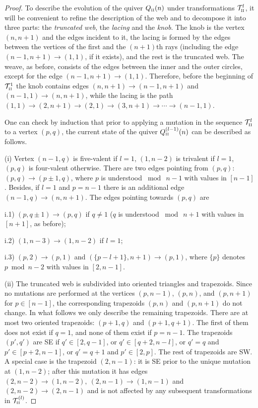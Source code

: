\documentclass{amsart}
\theoremstyle{definition}
\theoremstyle{remark}
\numberwithin{equation}{section}
\numberwithin{theorem}{section}
\begin{document}
\begin{proof}
To describe the evolution of the quiver $Q_{\mbox{\tiny\rm II}}(n)$ under transformations ${{\mathcal T}}^l_{\mbox{\tiny\rm II}}$, 
it will be convenient to refine the description
of the web and to decompose it into three parts: 
the {\it truncated web\/}, the {\it lacing\/} and the {\it knob\/}.
The knob is the vertex $(n,n+1)$ and the edges incident to it, the lacing is formed by the edges between the vertices of the first and the $(n+1)$th rays (including the edge $(n-1,n+1)\to (1,1)$, if it exists), 
and the rest is the truncated web. The weave, as before, consists of the edges
 between the inner and the outer circles, except for the edge $(n-1,n+1)\to (1,1)$. 
Therefore, before the beginning of ${{\mathcal T}}^1_{\mbox{\tiny\rm II}}$ the knob
contains edges $(n,n+1)\to (n-1,n+1)$ and $(n-1,1)\to (n,n+1)$, while the lacing is the path
$(1,1)\to (2,n+1)\to (2,1)\to (3,n+1)\to\cdots\to (n-1,1)$.
 
One can check by induction that prior to applying a mutation in the sequence ${{\mathcal T}}^l_{\mbox{\tiny\rm II}}$ to a vertex $(p,q)$, the current state of the quiver $Q^{(l-1)}_{\mbox{\tiny\rm II}}(n)$ can be described as follows. 

(i) Vertex $(n-1,q)$ is five-valent if $l=1$, $(1,n-2)$ is trivalent if $l=1$, $(p,q)$ is four-valent otherwise.
There are two edges pointing from $(p,q)$: $(p,q) \to (p\pm 1,q)$, where $p$ is understood $\bmod\ 
n-1$ with values in $[n-1]$. Besides, if $l=1$ and $p=n-1$ there is an additional edge $(n-1,q) \to (n,n+1)$.
The edges pointing towards $(p,q)$ are

i.1) $(p, q\pm 1) \to (p,q)$ if $ q\ne1$  
($q$ is understood $\bmod\ n+1$ with values in $[n+1]$, as before);

i.2) $(1, n- 3) \to (1,n-2)$  if $l=1$;

i.3) $(p, 2) \to (p,1)$ and $(\{p-l+1\}, n+1) \to (p,1)$, where $\{p\}$ denotes $p\bmod n-2$ with values in $[2,n-1]$.

(ii) The truncated web is subdivided into  oriented triangles and trapezoids. 
Since no mutations are performed at the vertices $(p,n-1)$, $(p,n)$, and $(p,n+1)$ for $p\in [n-1]$,
the corresponding trapezoids $(p,n)$ and $(p,n+1)$ do not change. In what follows we only
describe the remaining trapezoids.
There are at most two oriented trapezoids: $(p+1,q)$ and $(p+1,q+1)$. The first of them does not exist
if $q=1$, and none of them exist if $p=n-1$. 
The trapezoids $(p',q')$ are SE if $q'\in [2,q-1]$, or $q'\in [q+2,n-l]$, 
or $q'=q$ and $p'\in [p+2,n-1]$, or $q'=q+1$ and $p'\in [2,p]$.
The rest of trapezoids are SW.  A special case is the trapezoid $(2,n-1)$: it is SE prior to the unique mutation at
$(1,n-2)$; after this mutation it has edges $(2,n-2)\to (1,n-2),\ (2,n-1)\to (1,n-1)$ and $(2,n-2)\to (2,n-1)$ and is not affected by any subsequent transformations in ${{\mathcal T}}^{(l)}_{\mbox{\tiny\rm II}}$.


\end{proof}
\end{document}
